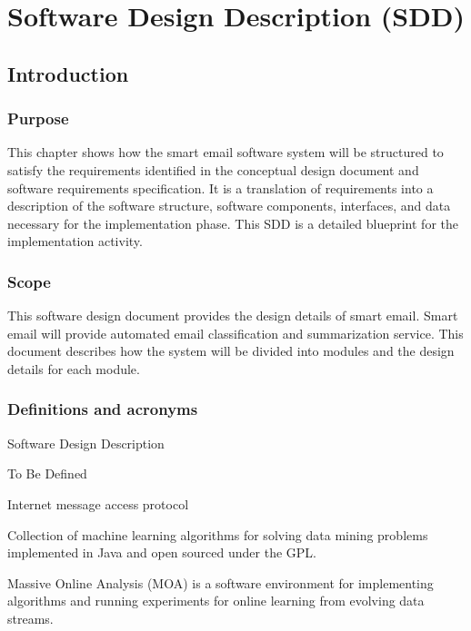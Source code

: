 \newenvironment{my_desc}
{\begin{description}
  \setlength{\itemsep}{0cm}
  \setlength{\parskip}{0cm}}
{\end{description}}

\chapter{Software Design Description (SDD)} %

\label{Chapter5} %


\section{Introduction}

\subsection{Purpose}
This chapter shows how the smart email software system will be structured to satisfy the requirements identiﬁed in the conceptual design document and software requirements speciﬁcation. It is a translation of requirements into a description of the software
structure, software components, interfaces, and data necessary for the implementation phase. This SDD is a detailed blueprint for the implementation activity.

\subsection{Scope}
This software design document provides the design details of smart email. Smart email will provide automated email classification and summarization service. This document describes how the system will be divided into modules and the design details for each module.

\subsection{Definitions and acronyms}
  \begin{my_desc}
    \item[SDD] Software Design Description
    \item[TBD] To Be Defined
    \item[IMAP] Internet message access protocol
    \item[WEKA] Collection of machine learning algorithms for solving data mining problems implemented in Java and open sourced under the GPL.
    \item[MOA] Massive Online Analysis (MOA) is a software environment for implementing algorithms and running experiments for online learning from evolving data streams.
  \end{my_desc}


